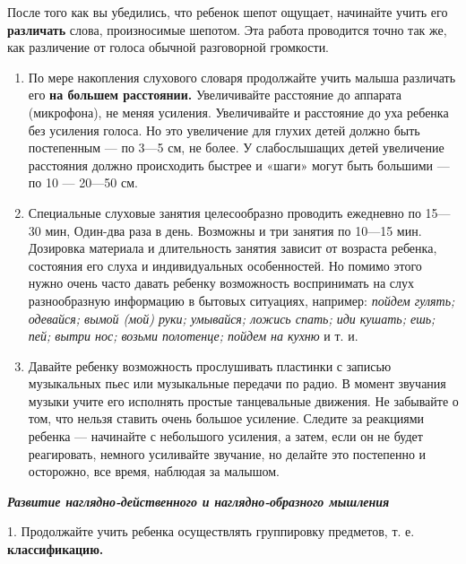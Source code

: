 \documentclass{book}
\renewcommand{\emph}[1]{\textit{#1}}
\begin{document}
После того как вы убедились, что ребенок шепот ощущает, начинайте учить
его \textbf{различать} слова, произносимые шепотом. Эта работа
проводится точно так же, как различение от голоса обычной разговорной
громкости.


\begin{enumerate}
\def\labelenumi{\arabic{enumi}.}
\setcounter{enumi}{5}
\item
  
  По мере накопления слухового словаря продолжайте учить малыша
  различать его \textbf{на большем расстоянии.} Увеличивайте расстояние
  до аппарата (микрофона), не меняя усиления. Увеличивайте и расстояние
  до уха ребенка без усиления голоса. Но это увеличение для глухих детей
  должно быть постепенным --- по 3---5 см, не более. У слабослышащих
  детей увеличение расстояния должно происходить быстрее и «шаги» могут
  быть большими --- по 10 --- 20---50 см.
  
\item
  
  Специальные слуховые занятия целесообразно проводить ежедневно по
  15---30 мин, Один-два раза в день. Возможны и три занятия по 10---15
  мин. Дозировка материала и длительность занятия зависит от возраста
  ребенка, состояния его слуха и индивидуальных особенностей. Но помимо
  этого нужно очень часто давать ребенку возможность воспринимать на
  слух разнообразную информацию в бытовых ситуациях, например:
  \emph{пойдем гулять; одевайся; вымой (мой) руки; умывайся; ложись
  спать; иди кушать; ешь; пей; вытри нос; возьми полотенце; пойдем на
  кухню} и т. и.
  
\item
  
  Давайте ребенку возможность прослушивать пластинки с записью
  музыкальных пьес или музыкальные передачи по радио. В момент звучания
  музыки учите его исполнять простые танцевальные движения. Не забывайте
  о том, что нельзя ставить очень большое усиление. Следите за реакциями
  ребенка --- начинайте с небольшого усиления, а затем, если он не будет
  реагировать, немного усиливайте звучание, но делайте это постепенно и
  осторожно, все время, наблюдая за малышом.
  
\end{enumerate}


\emph{\textbf{Развитие наглядно-действенного и наглядно-образного
мышления}}

1. Продолжайте учить ребенка осуществлять группировку предметов, т. е.
\textbf{классификацию.}
\end{document}
